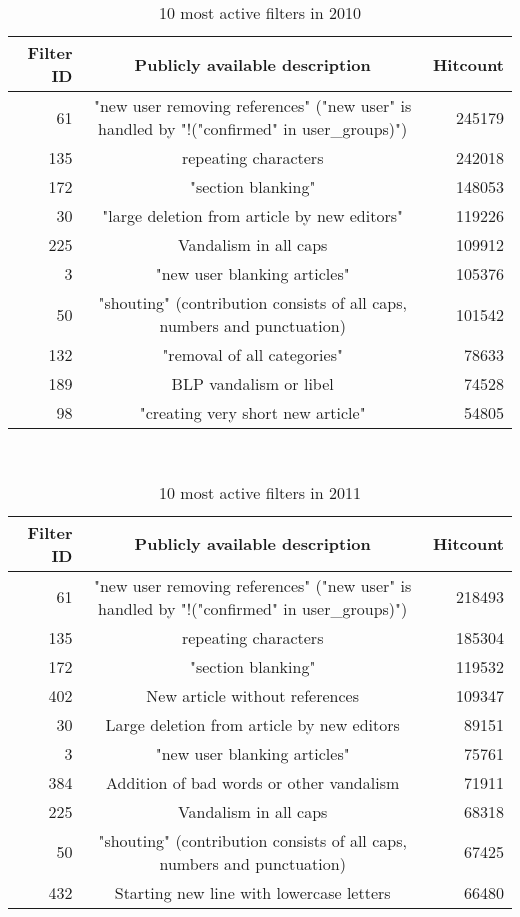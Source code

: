 \begin{table}
  \centering
  \begin{tabular}{r c r }
    Filter ID & Publicly available description & Hitcount \\
    \hline
    61 & "new user removing references" ("new user" is handled by "!("confirmed" in user\_groups)") & 245179 \\
    135 & repeating characters & 242018 \\
    172 & "section blanking" & 148053 \\
    30 & "large deletion from article by new editors" & 119226 \\
    225 & Vandalism in all caps & 109912 \\
    3 & "new user blanking articles" & 105376 \\
    50 & "shouting" (contribution consists of all caps, numbers and punctuation) & 101542 \\
    132 & "removal of all categories" & 78633 \\
    189 & BLP vandalism or libel & 74528 \\
    98 & "creating very short new article" & 54805 \\
  \end{tabular}
  \caption{10 most active filters in 2010}~\label{tab:most-active-2010}
\end{table}

\begin{table}
  \centering
  \begin{tabular}{r c r }
    Filter ID & Publicly available description & Hitcount \\
    \hline
    61 & "new user removing references" ("new user" is handled by "!("confirmed" in user\_groups)") & 218493 \\
    135 & repeating characters & 185304 \\
    172 & "section blanking" & 119532 \\
    402 & New article without references & 109347 \\
    30 & Large deletion from article by new editors & 89151 \\
    3 & "new user blanking articles" & 75761 \\
    384 & Addition of bad words or other vandalism & 71911 \\
    225 & Vandalism in all caps & 68318 \\
    50 & "shouting" (contribution consists of all caps, numbers and punctuation) & 67425 \\
    432 & Starting new line with lowercase letters & 66480 \\
  \end{tabular}
  \caption{10 most active filters in 2011}~\label{tab:most-active-2011}
\end{table}

